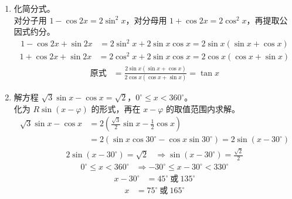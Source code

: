 \documentclass[12pt,a4paper]{exam-zh}
\begin{document}
\begin{solution}
    \begin{enumerate}[label=(\alph*)]
        \item 化简分式。 \\
        对分子用 $1-\cos2x=2\sin^2x$，对分母用 $1+\cos2x=2\cos^2x$，再提取公因式约分。 \\
        \begin{align*}
            1-\cos2x+\sin2x &= 2\sin^2x+2\sin x\cos x = 2\sin x(\sin x+\cos x)
        \end{align*}
        \begin{align*}
            1+\cos2x+\sin2x &= 2\cos^2x+2\sin x\cos x = 2\cos x(\cos x+\sin x)
        \end{align*}
        \begin{align*}
            \text{原式} &= \frac{2\sin x(\sin x+\cos x)}{2\cos x(\cos x+\sin x)} = \tan x
        \end{align*}

        \item 解方程 $\sqrt{3}\sin x-\cos x=\sqrt{2}$，$0^{\circ}\le x<360^{\circ}$。 \\
        化为 $R\sin(x-\varphi)$ 的形式，再在 $x-\varphi$ 的取值范围内求解。 \\
        \begin{align*}
            \sqrt{3}\sin x-\cos x &= 2\left(\frac{\sqrt{3}}{2}\sin x-\frac{1}{2}\cos x\right) \\
            &= 2\left(\sin x\cos30^{\circ}-\cos x\sin30^{\circ}\right) = 2\sin(x-30^{\circ})
        \end{align*}
        \begin{align*}
            2\sin(x-30^{\circ}) = \sqrt{2} &\Rightarrow \sin(x-30^{\circ}) = \frac{\sqrt{2}}{2}
        \end{align*}
        \begin{align*}
            0^{\circ}\le x<360^{\circ} &\Rightarrow -30^{\circ}\le x-30^{\circ}<330^{\circ}
        \end{align*}
        \begin{align*}
            x-30^{\circ} &= 45^{\circ} \ \text{或} \ 135^{\circ}
        \end{align*}
        \begin{align*}
            x &= 75^{\circ} \ \text{或} \ 165^{\circ}
        \end{align*}
    \end{enumerate}
\end{solution}
\end{document}
